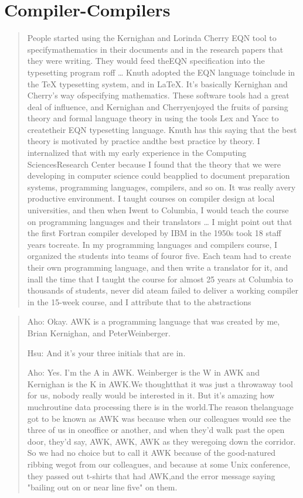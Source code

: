 \section{Compiler-Compilers}
\begin{quotation}
    People started using the Kernighan and Lorinda Cherry EQN tool to specifymathematics in their documents and in the research papers that they were writing. They would feed theEQN specification into the typesetting program roff
\dots
Knuth adopted the EQN language toinclude in the TeX typesetting system, and in LaTeX. It's basically Kernighan and Cherry's way ofspecifying mathematics. These software tools had a great deal of influence, and Kernighan and Cherryenjoyed the fruits of parsing theory and formal language theory in using the tools Lex and Yacc to createtheir EQN typesetting language. Knuth has this saying that the best theory is motivated by practice andthe best practice by theory. I internalized that with my early experience in the Computing SciencesResearch Center because I found that the theory that we were developing in computer science could beapplied to document preparation systems, programming languages, compilers, and so on. It was really avery productive environment. I taught courses on compiler design at local universities, and then when Iwent to Columbia, I would teach the course on programming languages and their translators
\dots
I might point out that the first Fortran compiler developed by IBM in the 1950s took 18 staff years tocreate. In my programming languages and compilers course, I organized the students into teams of fouror five. Each team had to create their own programming language, and then write a translator for it, and inall the time that I taught the course for almost 25 years at Columbia to thousands of students, never did ateam failed to deliver a working compiler in the 15-week course, and I attribute that to the abstractions
\cite{aho_oral_history_2022}
\end{quotation}
\begin{quotation}
    Aho: Okay. AWK is a programming language that was created by me, Brian 
Kernighan, and PeterWeinberger.

Hsu: And it's your three initials that are in.

Aho: Yes. I'm the A in AWK. Weinberger is the W in AWK and Kernighan is the 
K in AWK.We thoughtthat it was just a throwaway tool for us, nobody really 
would be interested in it. But it's amazing how muchroutine data processing 
there is in the world.The reason thelanguage got to be known as AWK was because 
when our colleagues would see the three of us in oneoffice or another, and when 
they'd walk past the open door, they'd say, AWK, AWK, AWK as they weregoing 
down the corridor. So we had no choice but to call it AWK because of the 
good-natured ribbing wegot from our colleagues, and because at some Unix 
conference, they passed out t-shirts that had AWK,and the error message saying 
"bailing out on or near line five" on them.
\end{quotation}
